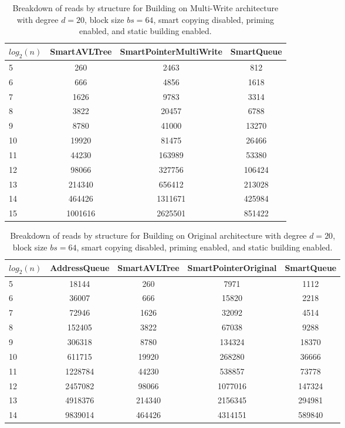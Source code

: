 \begin{table}[]
\centering
\begin{tabular}{|l|c|c|c|}
$log_2(n)$ & SmartAVLTree & SmartPointerMultiWrite & SmartQueue \\ \hline
5 & 260 & 2463 & 812 \\ \hline
6 & 666 & 4856 & 1618 \\ \hline
7 & 1626 & 9783 & 3314 \\ \hline
8 & 3822 & 20457 & 6788 \\ \hline
9 & 8780 & 41000 & 13270 \\ \hline
10 & 19920 & 81475 & 26466 \\ \hline
11 & 44230 & 163989 & 53380 \\ \hline
12 & 98066 & 327756 & 106424 \\ \hline
13 & 214340 & 656412 & 213028 \\ \hline
14 & 464426 & 1311671 & 425984 \\ \hline
15 & 1001616 & 2625501 & 851422 \\ \hline
\end{tabular}
\caption{Breakdown of reads by structure for Building on Multi-Write architecture with degree $d=20$, block size $bs=64$, smart copying disabled, priming enabled, and static building enabled.}
    \label{tab:reads_by_structure_build_d20_bs64_copiesfalse_primetrue_staticinsertiontrue_ptmultiwrite_movetrue}
\end{table}

\begin{table}[]
\centering
\begin{tabular}{|l|c|c|c|c|}
$log_2(n)$ & AddressQueue & SmartAVLTree & SmartPointerOriginal & SmartQueue \\ \hline
5 & 18144 & 260 & 7971 & 1112 \\ \hline
6 & 36007 & 666 & 15820 & 2218 \\ \hline
7 & 72946 & 1626 & 32092 & 4514 \\ \hline
8 & 152405 & 3822 & 67038 & 9288 \\ \hline
9 & 306318 & 8780 & 134324 & 18370 \\ \hline
10 & 611715 & 19920 & 268280 & 36666 \\ \hline
11 & 1228784 & 44230 & 538857 & 73778 \\ \hline
12 & 2457082 & 98066 & 1077016 & 147324 \\ \hline
13 & 4918376 & 214340 & 2156345 & 294981 \\ \hline
14 & 9839014 & 464426 & 4314151 & 589840 \\ \hline
\end{tabular}
\caption{Breakdown of reads by structure for Building on Original architecture with degree $d=20$, block size $bs=64$, smart copying disabled, priming enabled, and static building enabled.}
    \label{tab:reads_by_structure_build_d20_bs64_copiesfalse_primetrue_staticinsertiontrue_ptoriginal_movefalse}
\end{table}

